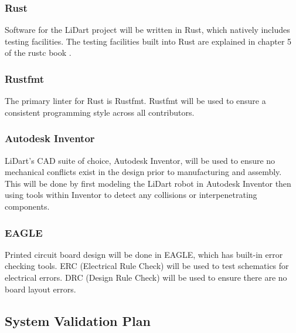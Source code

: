\documentclass[12pt, titlepage]{article}
\begin{document}


\subsubsection{Rust}
Software for the LiDart project will be written in Rust, which natively includes testing facilities.
The testing facilities built into Rust are explained in chapter 5 of the
rustc book \cite{rust}.

\subsubsection{Rustfmt}
The primary linter for Rust is Rustfmt. Rustfmt will be used to ensure a consistent
programming style across all contributors.

\subsubsection{Autodesk Inventor}
LiDart's CAD suite of choice, Autodesk Inventor, will be used to ensure no mechanical conflicts
exist in the design prior to manufacturing and assembly. This will be done by first modeling the LiDart
robot in Autodesk Inventor then using tools within Inventor to detect any
collisions or interpenetrating components.

\subsubsection{EAGLE}
Printed circuit board design will be done in EAGLE, which has built-in error checking tools. ERC (Electrical Rule Check) will be used to test schematics for electrical errors. DRC (Design Rule Check) will be used to ensure there are no board layout errors.

\subsection{System Validation Plan}


\end{document}
